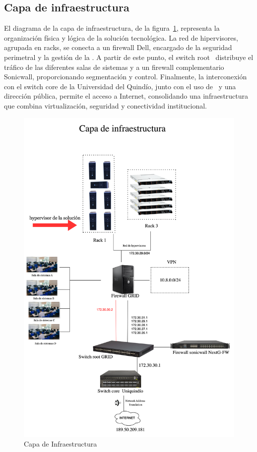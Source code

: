 \subsection{Capa de infraestructura}
\noindent
El diagrama de la capa de infraestructura, de la figura~\ref{fig:infraestructura}, representa la organización física y lógica de la solución tecnológica. La red de hipervisores, agrupada en racks, se conecta a un firewall Dell, encargado de la seguridad perimetral y la gestión de la \VPN. A partir de este punto, el switch root \GRID\ distribuye el tráfico de las diferentes salas de sistemas y a un firewall complementario Sonicwall, proporcionando segmentación y control. Finalmente, la interconexión con el switch core de la Universidad del Quindío, junto con el uso de \NAT\ y una dirección pública, permite el acceso a Internet, consolidando una infraestructura que combina virtualización, seguridad y conectividad institucional.
\begin{figure}[H]
    \centering
    \includegraphics[scale=0.13]{tablas-images/cp6/disenio-N1.png}
    \caption{Capa de Infraestructura}\label{fig:infraestructura}
\end{figure}

